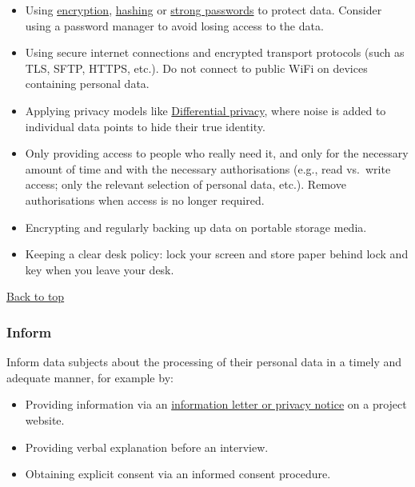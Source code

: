 \documentclass[
]{book}
\providecommand{\tightlist}{%
  \setlength{\itemsep}{0pt}\setlength{\parskip}{0pt}}
\begin{document}
\begin{itemize}
\tightlist
\item
  Using \protect\hyperlink{encryption}{encryption}, \protect\hyperlink{pseudonymisation-anonymisation}{hashing} or
  \href{https://students.uu.nl/en/practical-information/it-facilities/information-security/information-security-secure-access-choosing-a-secure-password}{strong passwords}
  to protect data. Consider using a password manager to avoid losing access to the
  data.
\item
  Using secure internet connections and encrypted transport protocols (such as
  TLS, SFTP, HTTPS, etc.). Do not connect to public WiFi on devices containing
  personal data.
\item
  Applying privacy models like \protect\hyperlink{differential-privacy}{Differential privacy},
  where noise is added to individual data points to hide their true identity.
\item
  Only providing access to people who really need it, and only for the necessary
  amount of time and with the necessary authorisations (e.g., read vs.~write
  access; only the relevant selection of personal data, etc.). Remove
  authorisations when access is no longer required.
\item
  Encrypting and regularly backing up data on portable storage media.
\item
  Keeping a clear desk policy: lock your screen and store paper behind lock and
  key when you leave your desk.
\end{itemize}

\protect\hyperlink{data-oriented-strategies}{Back to top}

\hypertarget{inform}{%
\subsubsection{\texorpdfstring{ Inform}{ Inform}}\label{inform}}

Inform data subjects about the processing of their personal data in a timely
and adequate manner, for example by:

\begin{itemize}
\tightlist
\item
  Providing information via an
  \protect\hyperlink{privacy-notices}{information letter or privacy notice} on a project website.
\item
  Providing verbal explanation before an interview.
\item
  Obtaining explicit consent via an informed consent procedure.
\end{itemize}
\end{document}
